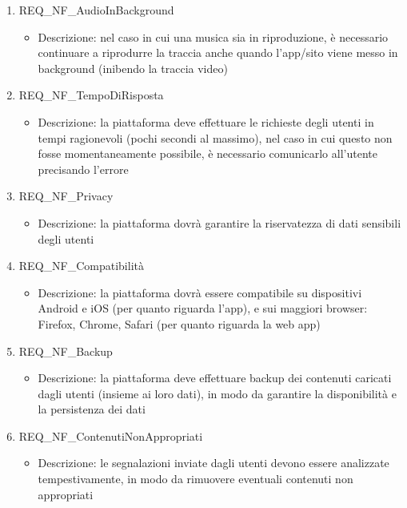 \begin{enumerate}
	\item REQ\_NF\_AudioInBackground
		\begin{itemize}
			\item Descrizione: nel caso in cui una musica sia in riproduzione, è necessario continuare a riprodurre la traccia anche quando l'app/sito viene messo in background (inibendo la traccia video)
		\end{itemize}
	
	\item REQ\_NF\_TempoDiRisposta
		\begin{itemize}
			\item Descrizione: la piattaforma deve effettuare le richieste degli utenti in tempi ragionevoli (pochi secondi al massimo), nel caso in cui questo non fosse momentaneamente possibile, è necessario comunicarlo all'utente precisando l'errore
		\end{itemize}

	\item REQ\_NF\_Privacy
		\begin{itemize}
			\item Descrizione: la piattaforma dovrà garantire la riservatezza di dati sensibili degli utenti
		\end{itemize}

	\item REQ\_NF\_Compatibilità
		\begin{itemize}
			\item Descrizione: la piattaforma dovrà essere compatibile su dispositivi Android e iOS (per quanto riguarda l'app), e sui maggiori browser: Firefox, Chrome, Safari (per quanto riguarda la web app)
		\end{itemize}
	
	\item REQ\_NF\_Backup
		\begin{itemize}
			\item Descrizione: la piattaforma deve effettuare backup dei contenuti caricati dagli utenti (insieme ai loro dati), in modo da garantire la disponibilità e la persistenza dei dati
		\end{itemize}

	\item REQ\_NF\_ContenutiNonAppropriati
		\begin{itemize}
			\item Descrizione: le segnalazioni inviate dagli utenti devono essere analizzate tempestivamente, in modo da rimuovere eventuali contenuti non appropriati
		\end{itemize}

\end{enumerate}
